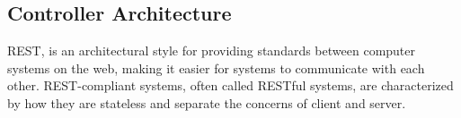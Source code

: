 
\subsection{Controller Architecture}
\ac{REST}, is an architectural style for providing standards between computer systems on the web, making it easier for systems to communicate with each other. REST-compliant systems, often called RESTful systems, are characterized by how they are stateless and separate the concerns of client and server.

